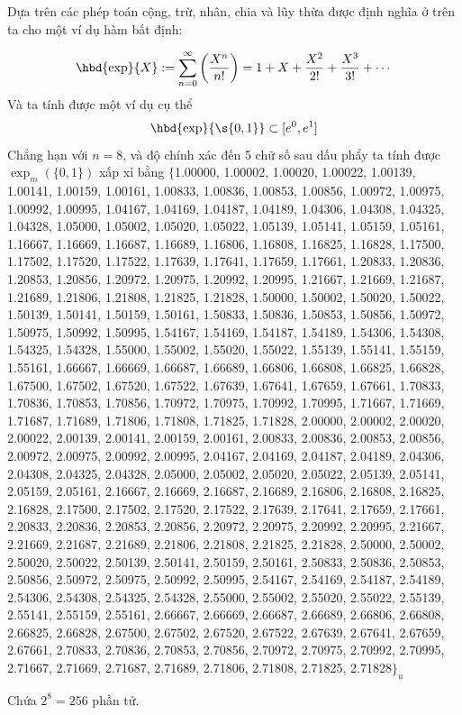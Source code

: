 \begin{example}
	Dựa trên các phép toán cộng, trừ, nhân, chia và lũy thừa được định nghĩa ở trên ta cho một ví dụ hàm bất định:

	$$\hbd{\exp}{X} := \sum_{n=0}^{\infty} \left(\frac{X^n}{n!}\right) = 1 + X + \frac{X^2}{2!} + \frac{X^3}{3!} + \cdots
	$$
	Và ta tính được một ví dụ cụ thể $$\hbd{\exp}{\s{0,1}} \subset [e^0,e^1]$$
	Chẳng hạn với $n=8$, và độ chính xác đến 5 chữ số sau dấu phẩy ta tính được $\exp_m\left(\{0,1\}\right)$ xấp xỉ bằng
	$\{$1.00000, 1.00002, 1.00020, 1.00022, 1.00139, 1.00141, 1.00159, 1.00161, 1.00833, 1.00836, 1.00853, 1.00856, 1.00972, 1.00975, 1.00992, 1.00995, 1.04167, 1.04169, 1.04187, 1.04189, 1.04306, 1.04308, 1.04325, 1.04328, 1.05000, 1.05002, 1.05020, 1.05022, 1.05139, 1.05141, 1.05159, 1.05161, 1.16667, 1.16669, 1.16687, 1.16689, 1.16806, 1.16808, 1.16825, 1.16828, 1.17500, 1.17502, 1.17520, 1.17522, 1.17639, 1.17641, 1.17659, 1.17661, 1.20833, 1.20836, 1.20853, 1.20856, 1.20972, 1.20975, 1.20992, 1.20995, 1.21667, 1.21669, 1.21687, 1.21689, 1.21806, 1.21808, 1.21825, 1.21828, 1.50000, 1.50002, 1.50020, 1.50022, 1.50139, 1.50141, 1.50159, 1.50161, 1.50833, 1.50836, 1.50853, 1.50856, 1.50972, 1.50975, 1.50992, 1.50995, 1.54167, 1.54169, 1.54187, 1.54189, 1.54306, 1.54308, 1.54325, 1.54328, 1.55000, 1.55002, 1.55020, 1.55022, 1.55139, 1.55141, 1.55159, 1.55161, 1.66667, 1.66669, 1.66687, 1.66689, 1.66806, 1.66808, 1.66825, 1.66828, 1.67500, 1.67502, 1.67520, 1.67522, 1.67639, 1.67641, 1.67659, 1.67661, 1.70833, 1.70836, 1.70853, 1.70856, 1.70972, 1.70975, 1.70992, 1.70995, 1.71667, 1.71669, 1.71687, 1.71689, 1.71806, 1.71808, 1.71825, 1.71828, 2.00000, 2.00002, 2.00020, 2.00022, 2.00139, 2.00141, 2.00159, 2.00161, 2.00833, 2.00836, 2.00853, 2.00856, 2.00972, 2.00975, 2.00992, 2.00995, 2.04167, 2.04169, 2.04187, 2.04189, 2.04306, 2.04308, 2.04325, 2.04328, 2.05000, 2.05002, 2.05020, 2.05022, 2.05139, 2.05141, 2.05159, 2.05161, 2.16667, 2.16669, 2.16687, 2.16689, 2.16806, 2.16808, 2.16825, 2.16828, 2.17500, 2.17502, 2.17520, 2.17522, 2.17639, 2.17641, 2.17659, 2.17661, 2.20833, 2.20836, 2.20853, 2.20856, 2.20972, 2.20975, 2.20992, 2.20995, 2.21667, 2.21669, 2.21687, 2.21689, 2.21806, 2.21808, 2.21825, 2.21828, 2.50000, 2.50002, 2.50020, 2.50022, 2.50139, 2.50141, 2.50159, 2.50161, 2.50833, 2.50836, 2.50853, 2.50856, 2.50972, 2.50975, 2.50992, 2.50995, 2.54167, 2.54169, 2.54187, 2.54189, 2.54306, 2.54308, 2.54325, 2.54328, 2.55000, 2.55002, 2.55020, 2.55022, 2.55139, 2.55141, 2.55159, 2.55161, 2.66667, 2.66669, 2.66687, 2.66689, 2.66806, 2.66808, 2.66825, 2.66828, 2.67500, 2.67502, 2.67520, 2.67522, 2.67639, 2.67641, 2.67659, 2.67661, 2.70833, 2.70836, 2.70853, 2.70856, 2.70972, 2.70975, 2.70992, 2.70995, 2.71667, 2.71669, 2.71687, 2.71689, 2.71806, 2.71808, 2.71825, 2.71828$\}_u$

	\noindent Chứa $2^8 = 256$ phần tử.
\end{example}
